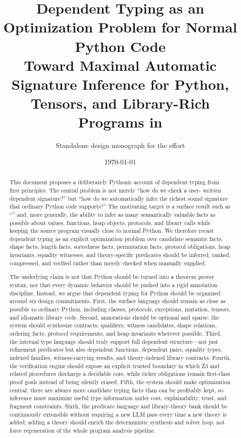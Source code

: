 \documentclass[11pt]{article}
\title{Dependent Typing as an Optimization Problem for Normal Python Code\\
\large Toward Maximal Automatic Signature Inference for Python, Tensors, and Library-Rich Programs in \DepPy}
\author{Standalone design monograph for the \DepPy{} effort}
\date{\today}
\newcommand{\Zthree}{\textsc{Z3}}
\newcommand{\py}[1]{\texttt{\detokenize{#1}}}
\theoremstyle{definition}
\theoremstyle{plain}
\begin{document}
\maketitle
\tableofcontents

\begin{abstract}
This document proposes a deliberately Pythonic account of dependent typing from
first principles. The central problem is not merely ``how do we check a user-
written dependent signature?'' but ``how do we automatically infer the richest
sound signature that ordinary Python code supports?'' The motivating target is a
surface result such as ``\py{a : Tensor | issorted(a)}'' and, more generally, the
ability to infer as many semantically valuable facts as possible about values,
functions, heap objects, protocols, and library calls while keeping the source
program visually close to normal Python. We therefore recast dependent typing as
an explicit optimization problem over candidate semantic facts: shape facts,
length facts, sortedness facts, permutation facts, protocol obligations, heap
invariants, equality witnesses, and theory-specific predicates should be
inferred, ranked, compressed, and verified rather than merely checked when
manually supplied.

The underlying claim is not that Python should be turned into a theorem prover
syntax, nor that every dynamic behavior should be pushed into a rigid
annotation discipline. Instead, we argue that dependent typing for Python
should be organized around six design commitments. First, the surface language
should remain as close as possible to ordinary Python, including classes,
protocols, exceptions, mutation, tensors, and idiomatic library code. Second,
annotations should be optional and sparse: the system should synthesize
contracts, qualifiers, witness candidates, shape relations, ordering facts,
protocol requirements, and heap invariants wherever possible. Third, the
internal type language should truly support full dependent structure---not just
refinement predicates but also dependent functions, dependent pairs, equality
types, indexed families, witness-carrying results, and theory-indexed library
contracts. Fourth, the verification engine should expose an explicit trusted
boundary in which \Zthree{} and related procedures discharge a decidable core,
while richer obligations remain first-class proof goals instead of being
silently erased. Fifth, the system should make optimization central: there are
always more candidate typing facts than can be profitably kept, so inference
must maximize useful type information under cost, explainability, trust, and
fragment constraints. Sixth, the predicate language and library-theory bank
should be continuously extensible without requiring a new LLM pass every time a
new theory is added; adding a theory should enrich the deterministic synthesis
and solver loop, not force regeneration of the whole program analysis pipeline.


\end{abstract}
\end{document}
